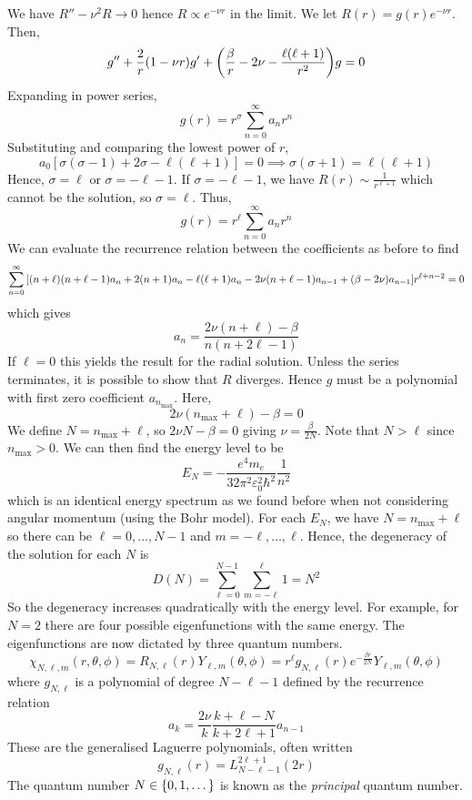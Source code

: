 We have \( R'' - \nu^2 R \to 0 \) hence \( R \propto e^{-\nu r} \) in the limit.
We let \( R(r) = g(r) e^{-\nu r} \).
Then,
\[
	g'' + \frac{2}{r} (1 - \nu r) g' + \qty(\frac{\beta}{r} - 2 \nu - \frac{\ell(\ell+1)}{r^2}) g = 0
\]
Expanding in power series,
\[
	g(r) = r^\sigma \sum_{n=0}^\infty a_n r^n
\]
Substituting and comparing the lowest power of \( r \),
\[
	a_0 [ \sigma (\sigma - 1) + 2 \sigma - \ell(\ell + 1) ] = 0 \implies \sigma(\sigma + 1) = \ell(\ell + 1)
\]
Hence, \( \sigma = \ell \) or \( \sigma = -\ell - 1 \).
If \( \sigma = -\ell - 1 \), we have \( R(r) \sim \frac{1}{r^{\ell + 1}} \) which cannot be the solution, so \( \sigma = \ell \).
Thus,
\[
	g(r) = r^\ell \sum_{n=0}^\infty a_n r^n
\]
We can evaluate the recurrence relation between the coefficients as before to find
\[
	\sum_{n=0}^\infty \qty[(n+\ell)(n+\ell - 1)a_n + 2(n+1)a_n - \ell(\ell+1)a_n - 2 \nu(n+\ell - 1) a_{n-1} + (\beta - 2\nu) a_{n-1}] r^{\ell + n - 2} = 0
\]
which gives
\[
	a_n = \frac{2\nu(n+\ell) - \beta}{n(n+2\ell - 1)}
\]
If \( \ell = 0 \) this yields the result for the radial solution.
Unless the series terminates, it is possible to show that \( R \) diverges.
Hence \( g \) must be a polynomial with first zero coefficient \( a_{n_{\max}} \).
Here,
\[
	2\nu(n_{\max} + \ell) - \beta = 0
\]
We define \( N = n_{\max} + \ell \), so \( 2 \nu N - \beta = 0 \) giving \( \nu = \frac{\beta}{2N} \).
Note that \( N > \ell \) since \( n_{\max} > 0 \).
We can then find the energy level to be
\[
	E_N = -\frac{e^4 m_e}{32 \pi^2 \varepsilon_0^2 \hbar^2} \frac{1}{n^2}
\]
which is an identical energy spectrum as we found before when not considering angular momentum (using the Bohr model).
For each \( E_N \), we have \( N = n_{\max} + \ell \) so there can be \( \ell = 0, \dots, N-1 \) and \( m = -\ell, \dots, \ell \).
Hence, the degeneracy of the solution for each \( N \) is
\[
	D(N) = \sum_{\ell=0}^{N-1} \sum_{m=-\ell}^\ell 1 = N^2
\]
So the degeneracy increases quadratically with the energy level.
For example, for \( N = 2 \) there are four possible eigenfunctions with the same energy.
The eigenfunctions are now dictated by three quantum numbers.
\[
	\chi_{N,\ell,m}(r,\theta,\phi) = R_{N,\ell}(r)Y_{\ell,m}(\theta,\phi) = r^\ell g_{N,\ell}(r) e^{-\frac{\beta r}{2N}} Y_{\ell,m}(\theta,\phi)
\]
where \( g_{N,\ell} \) is a polynomial of degree \( N - \ell - 1 \) defined by the recurrence relation
\[
	a_k = \frac{2\nu}{k} \frac{k + \ell - N}{k + 2\ell + 1} a_{n-1}
\]
These are the generalised Laguerre polynomials, often written
\[
	g_{N,\ell}(r) = L_{N - \ell - 1}^{2\ell + 1}(2r)
\]
The quantum number \( N \in \qty{0, 1, \dots} \) is known as the \textit{principal} quantum number.

